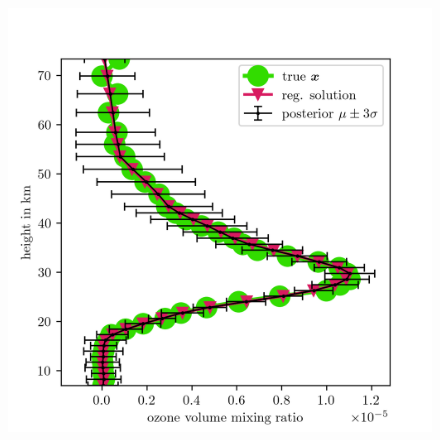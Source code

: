 \begin{figure}[ht!]
	\centering
	\includegraphics{SecRecResinclReg.png}
	\caption[]{}
	\label{fig:O3SolplsReg}
\end{figure}




